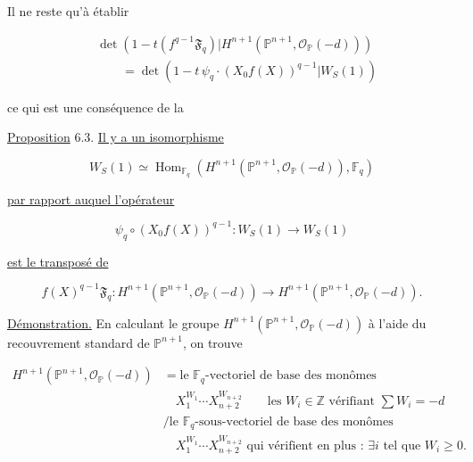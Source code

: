 Il ne reste qu'à établir

\begin{equation}\tag{6.2.8}
\begin{aligned}
&\det\!\left(
1-t(f^{q-1}\mathfrak F_q)
\mathrel{\Big|}
H^{n+1}(\mathbb P^{n+1},\mathcal O_{\mathbb P}(-d))
\right)\\
&\qquad=
\det\!\left(
1-t\,\psi_q\cdot(X_0f(X))^{q-1}
\mathrel{\Big|}W_S(1)
\right)
\end{aligned}
\end{equation}

ce qui est une conséquence de la

\underline{Proposition} 6.3.
\underline{Il y a un isomorphisme}

\begin{equation}\tag{6.3.1}
W_S(1)\simeq
\operatorname{Hom}_{\mathbb F_q}\!\left(
H^{n+1}(\mathbb P^{n+1},\mathcal O_{\mathbb P}(-d)),
\mathbb F_q\right)
\end{equation}

\underline{par rapport auquel l'opérateur}

\begin{equation}\tag{6.3.2}
\psi_q\circ(X_0f(X))^{q-1}:W_S(1)\longrightarrow W_S(1)
\end{equation}


\underline{est le transposé de}

\begin{equation}\tag{6.3.3}
f(X)^{q-1}\mathfrak F_q:
H^{n+1}(\mathbb P^{n+1},\mathcal O_{\mathbb P}(-d))
\longrightarrow
H^{n+1}(\mathbb P^{n+1},\mathcal O_{\mathbb P}(-d)).
\end{equation}

\underline{Démonstration.}
En calculant le groupe
$H^{n+1}(\mathbb P^{n+1},\mathcal O_{\mathbb P}(-d))$ à l'aide du
recouvrement standard de $\mathbb P^{n+1}$, on trouve

\begin{equation}\tag{6.3.4}
\begin{aligned}
H^{n+1}(\mathbb P^{n+1},\mathcal O_{\mathbb P}(-d))
&=\text{le $\mathbb F_q$-vectoriel de base des monômes}\\
&\quad X_1^{W_1}\cdots X_{n+2}^{W_{n+2}}
\qquad\text{les }W_i\in\mathbb Z\text{ vérifiant }\sum W_i=-d\\
&\mathrel{\big/}\text{le $\mathbb F_q$-sous-vectoriel de base des monômes}\\
&\quad X_1^{W_1}\cdots X_{n+2}^{W_{n+2}}
\text{ qui vérifient en plus : }\exists i\text{ tel que }W_i\geq0.
\end{aligned}
\end{equation}

